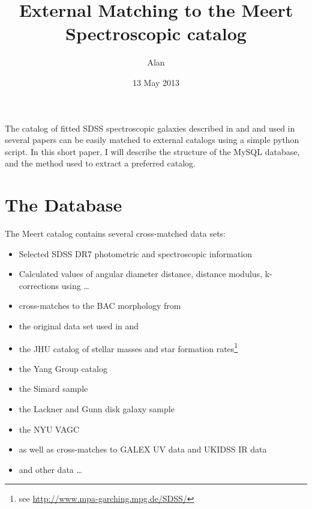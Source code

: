 \documentclass[useAMS,usenatbib,usegraphicx]{./mn2e}
\title{External Matching to the Meert Spectroscopic catalog}
\author{Alan}
\date{13 May 2013}
\newcommand{\eg}{e.\,g. }
\begin{document}
\maketitle

The catalog of fitted SDSS spectroscopic galaxies described in \cite{Meert2013} and \cite{Meert2013a} and used in several papers 
\citep[\eg][]{Shankar,huertas12,Bernardi2013,Bernardi2013b} can be easily matched to external catalogs using a simple python script. In this short paper, I will describe the structure of the MySQL database, and the method used to extract a preferred catalog.

\section{The Database}\label{database}
The Meert catalog contains several cross-matched data sets:
\begin{itemize}
 \item Selected SDSS DR7 photometric and spectroscopic information \citep{Strauss2002, DR7}
 \item Calculated values of angular diameter distance, distance modulus, k-corrections using \cite{blantonKcorr}\ldots
 \item cross-matches to the BAC morphology from \cite{huertas10}
 \item the original data set used in \cite{Bernardi2009} and \cite{BernardiHyde2007}
 \item the JHU catalog of stellar masses and star formation rates\footnote{see \url{http://www.mpa-garching.mpg.de/SDSS/}}
 \item the Yang Group catalog \citep{yang2005}
 \item the Simard sample \citep{simard11}
 \item the Lackner and Gunn disk galaxy sample \citep{Lackner2012}
 \item the NYU VAGC \citep{nyu_vagc}
 \item as well as cross-matches to GALEX \citep{GALEX} UV data and UKIDSS \citep{Ham08} IR data
 \item and other data \ldots
\end{itemize}
\end{document}

